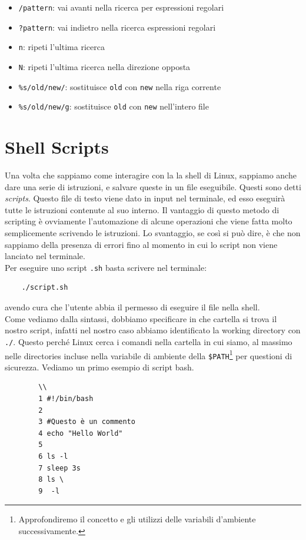 \begin{itemize}
\begin{itemize}
 			\item \verb*|/pattern|: vai avanti nella ricerca per espressioni regolari
 			\item \verb*|?pattern|: vai indietro nella ricerca espressioni regolari
 			\item \verb*|n|: ripeti l'ultima ricerca
 			\item \verb*|N|: ripeti l'ultima ricerca nella direzione opposta
 			\item \verb*|%s/old/new/|: sostituisce \verb*|old| con \verb*|new| nella riga corrente
 			\item \verb*|%s/old/new/g|: sostituisce \verb*|old| con \verb*|new| nell'intero file		
 		\end{itemize}
 \end{itemize}


\section{Shell Scripts}
Una volta che sappiamo come interagire con la la shell di Linux, sappiamo anche dare una serie di istruzioni, e salvare queste in un file eseguibile. Questi sono detti \textit{scripts}. Questo file di testo viene dato in input nel terminale, ed esso eseguirà tutte le istruzioni contenute al suo interno. Il vantaggio di questo metodo di scripting è ovviamente l'automazione di alcune operazioni che viene fatta molto semplicemente scrivendo le istruzioni. Lo svantaggio, se così si può dire, è che non sappiamo della presenza di errori fino al momento in cui lo script non viene lanciato nel terminale. \\
Per eseguire uno script \verb*|.sh| basta scrivere nel terminale:
\begin{verbatim}
	./script.sh
\end{verbatim}
avendo cura che l'utente abbia il permesso di eseguire il file nella shell.\\
Come vediamo dalla sintassi, dobbiamo specificare in che cartella si trova il nostro script, infatti nel nostro caso abbiamo identificato la working directory con \verb*|./|. Questo perché Linux cerca i comandi nella cartella in cui siamo, al massimo nelle directories incluse nella variabile di ambiente della \verb*|$PATH|\footnote{Approfondiremo il concetto e gli utilizzi delle variabili d'ambiente successivamente.} per questioni di sicurezza. Vediamo un primo esempio di script bash.
\begin{esempio}
	\begin{verbatim}
		\\
		1 #!/bin/bash
		2
		3 #Questo è un commento
		4 echo "Hello World"
		5
		6 ls -l
		7 sleep 3s
		8 ls \
		9  -l
	\end{verbatim}
\end{esempio}

